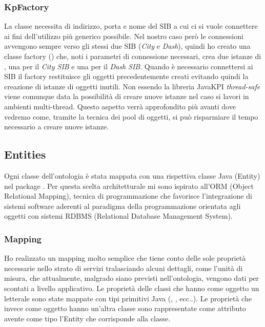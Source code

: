 \subsubsection{KpFactory}

La classe  necessita di indirizzo, porta e nome del SIB a cui ci si vuole connettere ai fini dell'utilizzo più generico possibile. Nel nostro caso però le connessioni avvengono sempre verso gli stessi due SIB (\emph{City} e \emph{Dash}), quindi ho creato una classe factory () che, noti i parametri di connessione necessari, crea due istanze di , una per il \emph{City SIB} e una per il \emph{Dash SIB}. Quando è necessario connettersi ai SIB il factory restituisce gli oggetti precedentemente creati evitando quindi la creazione di istanze di oggetti inutili. Non essendo la libreria JavaKPI \emph{thread-safe} viene comunque data la possibilità di creare nuove istanze nel caso si lavori in ambienti multi-thread. Questo aspetto verrà approfondito più avanti dove vedremo come, tramite la tecnica dei pool di oggetti, si può risparmiare il tempo necessario a creare nuove istanze.


\subsection{Entities}

Ogni classe dell'ontologia è stata mappata con una rispettiva classe Java (Entity) nel package . Per questa scelta architetturale mi sono ispirato all'ORM (Object Relational Mapping), tecnica di programmazione che favorisce l'integrazione di sistemi software aderenti al paradigma della programmazione orientata agli oggetti con sistemi RDBMS (Relational Database Management System). %

\subsubsection{Mapping} 

Ho realizzato un mapping molto semplice che tiene conto delle sole proprietà necessarie nello strato di servizi 
 tralasciando alcuni dettagli, come l'unità di misura, che attualmente, malgrado siano previsti nell'ontologia, vengono dati per scontati a livello applicativo.
Le proprietà delle classi che hanno come oggetto un letterale sono state mappate con tipi primitivi Java (,  ,  ecc..). Le proprietà che invece come oggetto hanno un'altra classe sono rappresentate come attributo avente come tipo l'Entity che corrisponde alla classe. 

